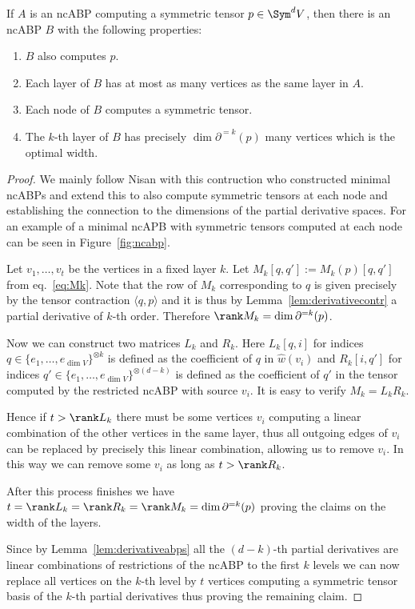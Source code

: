 \begin{proposition}
    \label{prop:minimalsym}
    If $A$ is an ncABP computing a symmetric tensor $p \in \Sym^d V$, then there is an ncABP $B$ with the following properties:
    \begin{enumerate}
        \item $B$ also computes $p$.
        \item Each layer of $B$ has at most as many vertices as the same layer in $A$.
        \item Each node of $B$ computes a symmetric tensor.
        \item The $k$-th layer of $B$ has precisely $\dim\partial^{=k}(p)$ many vertices which is the optimal width.
    \end{enumerate}
\end{proposition}
\begin{proof}
    We mainly follow Nisan \cite{nisan1991lower} with this contruction who constructed minimal ncABPs and extend this to also compute symmetric tensors at each node and establishing the connection to the dimensions of the partial derivative spaces.
    For an example of a minimal ncAPB with symmetric tensors computed at each node can be seen in Figure~\ref{fig:ncabp}.

    Let $v_1, \ldots, v_t$ be the vertices in a fixed layer $k$. Let $M_k[q, q'] := M_k(p)[q,q']$ from eq.~\eqref{eq:Mk}.
    Note that the row of $M_k$ corresponding to $q$ is given precisely by the tensor contraction $\langle q, p \rangle$ and it is thus by Lemma~\ref{lem:derivativecontr} a partial derivative of $k$-th order.
    Therefore $\rank M_k = \dim \partial^{=k}(p)$.

    Now we can construct two matrices $L_k$ and $R_k$.
    Here $L_k[q, i]$ for indices $q \in \{e_1, \dots, e_{\dim V}\}^{\otimes k}$ is defined as the coefficient of $q$ in $\hat{w}(v_i)$ and $R_k[i, q']$ for indices $q' \in \{e_1, \dots, e_{\dim V}\}^{\otimes (d-k)}$ is defined as the coefficient of $q'$ in the tensor computed by the restricted ncABP with source $v_i$.
    It is easy to verify $M_k = L_k R_k$.

    Hence if $t > \rank L_k$ there must be some vertices $v_i$ computing a linear combination of the other vertices in the same layer, thus all outgoing edges of $v_i$ can be replaced by precisely this linear combination, allowing us to remove $v_i$.
    In this way we can remove some $v_i$ as long as $t > \rank R_k$.

    After this process finishes we have $t = \rank L_k = \rank R_k = \rank M_k = \dim \partial^{=k}(p)$ proving the claims on the width of the layers.

    Since by Lemma~\ref{lem:derivativeabps} all the $(d-k)$-th partial derivatives are linear combinations of restrictions of the ncABP to the first $k$ levels we can now replace all vertices on the $k$-th level by $t$ vertices computing a symmetric tensor basis of the $k$-th partial derivatives thus proving the remaining claim.
\end{proof}

